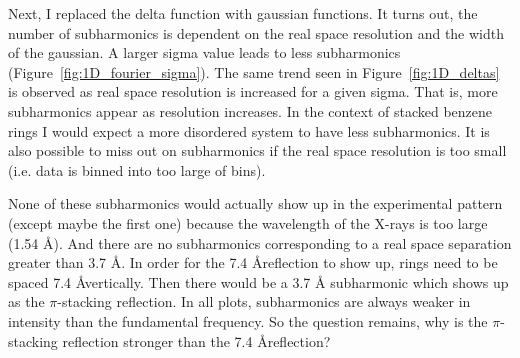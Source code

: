 \documentclass{article}
\begin{document}
Next, I replaced the delta function with gaussian functions. It turns out, the
number of subharmonics is dependent on the real space resolution and the width
of the gaussian. A larger sigma value leads to less subharmonics
(Figure~\ref{fig:1D_fourier_sigma}). The same trend seen in
Figure~\ref{fig:1D_deltas} is observed as real space resolution is increased
for a given sigma. That is, more subharmonics appear as resolution increases.
In the context of stacked benzene rings I would expect a more disordered system
to have less subharmonics. It is also possible to miss out on subharmonics if
the real space resolution is too small (i.e. data is binned into too large of
bins). 

None of these subharmonics would actually show up in the experimental pattern
(except maybe the first one) because the wavelength of the X-rays is too large
(1.54 \AA). And there are no subharmonics corresponding to a real space
separation greater than 3.7 \AA. In order for the 7.4 \AA reflection to show
up, rings need to be spaced 7.4 \AA vertically. Then there would be a 3.7 \AA
subharmonic which shows up as the $\pi$-stacking reflection. In all plots,
subharmonics are always weaker in intensity than the fundamental frequency. 
So the question remains, why is the $\pi$-stacking reflection stronger than
the 7.4 \AA reflection? 
\end{document}
